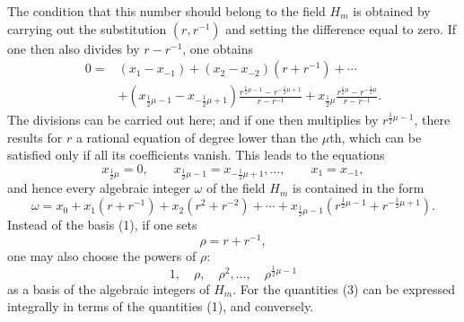 \documentclass[11pt]{article}
\begin{document}
The condition that this number should belong to the field $H_m$ is obtained by carrying out the substitution $(r,r^{-1})$ and setting the difference equal to zero. If one then also divides by $r-r^{-1}$, one obtains
\begin{align*}
0={}&(x_1-x_{-1})+(x_2-x_{-2})(r+r^{-1})+\cdots \\
&+(x_{\frac12\mu-1}-x_{-\frac12\mu+1})\frac{r^{\frac12\mu-1}-r^{-\frac12\mu+1}}{r-r^{-1}}
+x_{\frac12\mu}\frac{r^{\frac12\mu}-r^{-\frac12\mu}}{r-r^{-1}}.
\end{align*}
The divisions can be carried out here; and if one then multiplies by $r^{\frac12\mu-1}$, there results for $r$ a rational equation of degree lower than the $\mu$th, which can be satisfied only if all its coefficients vanish. This leads to the equations
\[
x_{\frac12\mu}=0,\qquad x_{\frac12\mu-1}=x_{-\frac12\mu+1},\ldots,\qquad x_1=x_{-1},
\]
and hence every algebraic integer $\omega$ of the field $H_m$ is contained in the form
\[
\omega=x_0+x_1(r+r^{-1})+x_2(r^2+r^{-2})+\cdots+x_{\frac12\mu-1}(r^{\frac12\mu-1}+r^{-\frac12\mu+1}).
\]
Instead of the basis (1), if one sets
\[
\rho=r+r^{-1},
\]
one may also choose the powers of $\rho$:
\begin{equation}
1,\quad \rho,\quad \rho^2,\ldots,\quad \rho^{\frac12\mu-1}
\tag{3}
\end{equation}
as a basis of the algebraic integers of $H_m$. For the quantities (3) can be expressed integrally in terms of the quantities (1), and conversely.
\end{document}

